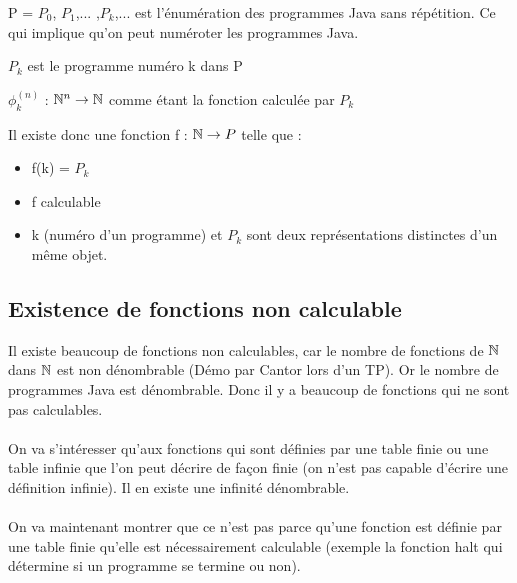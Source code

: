 \begin{mydef}[Énumération de P]
	P = $P_0$, $P_1$,... ,$P_k$,... est l'énumération des programmes Java 
	sans répétition. Ce qui implique qu'on peut numéroter les programmes Java.\\
\end{mydef}

\begin{mydef}[$P_k$]
	$P_k$ est le programme numéro k dans P
\end{mydef}

\begin{mydef}[$\phi^{(n)}_k$]
	$\phi^{(n)}_k$ : $\mathbb{N}^n \rightarrow \mathbb{N}$ comme 
	étant la fonction calculée par $P_k$
\end{mydef}


\begin{myprop}
	Il existe donc une fonction f : $\mathbb{N}\rightarrow P$ telle que :
	\begin{itemize}
		\item f(k) = $P_k$
		\item f calculable
		\item k (numéro d'un programme) et $P_k$ sont deux représentations 
			distinctes d'un même objet.
	\end{itemize}
\end{myprop}


\subsection{Existence de fonctions non calculable}
\label{sub:existence_de_fonction_non_calculables}
Il existe beaucoup de fonctions non calculables, car le nombre de fonctions de $\mathbb{N}$ 
dans $\mathbb{N}$ est non dénombrable (Démo par Cantor lors d'un TP). Or le nombre de 
programmes Java est dénombrable. Donc il y a beaucoup de fonctions qui ne sont 
pas calculables.

\paragraph{} On va s'intéresser qu'aux fonctions qui sont définies par une table 
finie ou une table infinie que l'on peut décrire de façon finie 
(on n'est pas capable d'écrire une définition infinie). Il en existe une infinité 
dénombrable.

\paragraph{} On va maintenant montrer que ce n'est pas parce qu’une fonction 
est définie par une table finie qu'elle est nécessairement calculable (exemple la 
fonction halt qui détermine si un programme se termine ou non).

